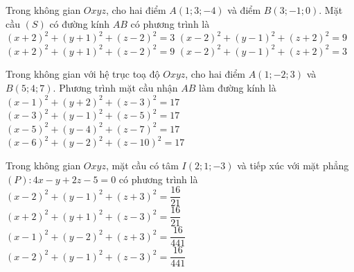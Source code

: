 \begin{ex}%
	Trong  không gian $Oxyz$, cho hai điểm $A(1; 3;-4)$ và điểm $B(3;-1; 0)$. Mặt cầu $(S)$ có đường kính $AB$ có phương trình là
	 \choice
		{$(x+2)^2+(y+1)^2+(z-2)^2=3$} 
		{\True  $(x-2)^2+(y-1)^2+(z+2)^2=9$}
		{$(x+2)^2+(y+1)^2+(z-2)^2=9$} 
		{$(x-2)^2+(y-1)^2+(z+2)^2=3$} 
\end{ex}

\begin{ex}%
	Trong không gian với hệ trục toạ độ $Oxyz$, cho hai điểm $A\left(1;-2;3\right)$ và $B\left(5;4;7\right)$. Phương trình mặt cầu nhận $AB$ làm  đường kính là
	\choice 
		 {$\left(x-1\right)^2+\left(y+2\right)^2+\left(z-3\right)^2=17$}
		{\True $\left(x-3\right)^2+\left(y-1\right)^2+\left(z-5\right)^2=17$} 
		{$\left(x-5\right)^2+\left(y-4\right)^2+\left(z-7\right)^2=17$} 
		 {$\left(x-6\right)^2+\left(y-2\right)^2+\left(z-10\right)^2=17$}
\end{ex}

\begin{ex}%
	Trong không gian $Oxyz$, mặt cầu có tâm $I\left(2;1;-3\right)$ và tiếp xúc  với mặt phẳng $(P)\colon 4x-y+2z-5=0$ có phương trình là
	 \choice
		{\True  $\left(x-2\right)^2+\left(y-1\right)^2+\left(z+3\right)^2=\dfrac{16}{21}$}
		 {$\left(x+2\right)^2+\left(y+1\right)^2+\left(z-3\right)^2=\dfrac{16}{21}$}
		{$\left(x-1\right)^2+\left(y-2\right)^2+\left(z+3\right)^2=\dfrac{16}{441}$} 
		 {$\left(x-2\right)^2+\left(y-1\right)^2+\left(z-3\right)^2=\dfrac{16}{441}$}
\end{ex}

